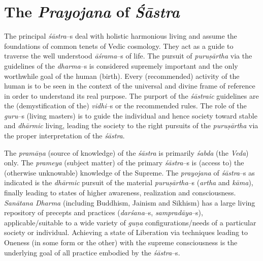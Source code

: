 \section*{The \textit{Prayojana} of \textit{Śāstra}}

The principal \textit{śāstra}–s deal with holistic harmonious living and assume the foundations of common tenets of Vedic cosmology. They act as a guide to traverse the well understood \textit{āśrama}–s of life. The pursuit of \textit{puruṣārtha} via the guidelines of the \textit{dharma}–s is considered supremely important and the only worthwhile goal of the human (birth). Every (recommended) activity of the human is to be seen in the context of the universal and divine frame of reference in order to understand its real purpose. The purport of the \textit{śāstraic} guidelines are the (demystification of the) \textit{vidhi}–s or the recommended rules. The role of the \textit{guru}–s (living masters) is to guide the individual and hence society toward stable and \textit{dhārmic} living, leading the society to the right pursuits of the \textit{puruṣārtha} via the proper interpretation of the \textit{śāstra}.

The \textit{pramāṇa} (source of knowledge) of the \textit{śāstra} is primarily \textit{śabda} (the \textit{Veda}) only. The \textit{prameya} (subject matter) of the primary \textit{śāstra}–s is (access to) the (otherwise unknowable) knowledge of the Supreme. The \textit{prayojana} of \textit{śāstra}–s as indicated is the \textit{dhārmic} pursuit of the material \textit{puruṣārtha}–s (\textit{artha} and \textit{kāma}), finally leading to states of higher awareness, realization and consciousness. \textit{Sanātana Dharma} (including Buddhism, Jainism and Sikhism) has a large living repository of precepts and practices (\textit{darśana}–s, \textit{sampradāya}–s), applicable/suitable to a wide variety of \textit{guṇa} configurations/needs of a particular society or individual. Achieving a state of Liberation via techniques leading to Oneness (in some form or the other) with the supreme consciousness is the underlying goal of all practice embodied by the \textit{śāstra}–s.

